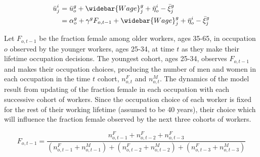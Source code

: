 \documentclass[12pt]{article}
\begin{document}
\begin{align*}
\bar{u}^{i}_j &= \bar{u}^{g}_o + \widebar{Wage}^g_j   + \bar{\eta}^i_o - \bar{\xi}^g_j \\
    &= \alpha^g_o +   \gamma^g F_{o,t-1} + \widebar{Wage}^g_j   + \bar{\eta}^i_o - \bar{\xi}^g_j
\end{align*}

Let $F_{o,t-1}$ be the fraction female among older workers, ages 35-65, in occupation $o$ observed by the younger workers, ages 25-34, at time $t$ as they make their lifetime occupation decisions. The youngest cohort, ages 25-34, observes $F_{o,t-1}$ and makes their occupation choices, producing the number of men and women in each occupation in the time $t$ cohort, $n^F_{o,t}$ and $n^M_{o,t}$. The dynamics of the model result from updating of the fraction female in each occupation with each successive cohort of workers.  Since the occupation choice of each worker is fixed for the rest of their working lifetime (assumed to be 40 years), their choice which will influence the fraction female observed by the next three cohorts of workers.




$$F_{o,t-1} = \frac{n^F_{o,t-1} + n^F_{o,t-2} + n^F_{o,t-3}}{(n^F_{o,t-1} + n^M_{o,t-1}) + (n^F_{o,t-2} + n^M_{o,t-2}) + (n^F_{o,t-3} + n^M_{o,t-3}) } $$



\end{document}
